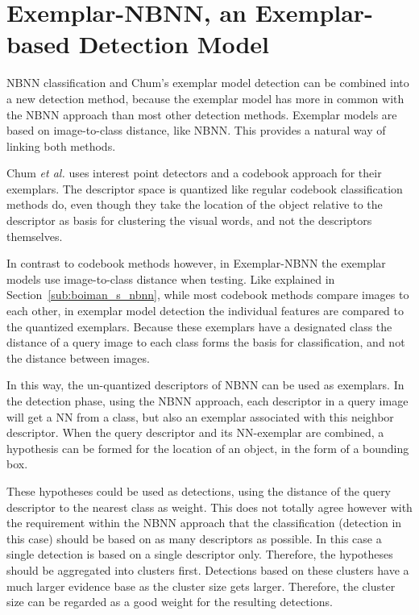 
\section{Exemplar-NBNN, an Exemplar-based Detection Model} %
\label{cha:linking}

NBNN classification and Chum's exemplar model detection \cite{chum2007exemplar} can be combined into a new detection method, because the exemplar model has more in common with the NBNN approach than most other detection methods. Exemplar models are based on image-to-class distance, like NBNN. This provides a natural way of linking both methods.

Chum \emph{et al.}\cite{chum2007exemplar} uses interest point detectors and a codebook approach for their exemplars. The descriptor space is quantized like regular codebook classification methods do, even though they take the location of the object relative to the descriptor as basis for clustering the visual words, and not the descriptors themselves.

In contrast to codebook methods however, in Exemplar-NBNN the exemplar models use image-to-class distance when testing. Like explained in Section~\ref{sub:boiman_s_nbnn}, while most codebook methods compare images to each other, in exemplar model detection the individual features are compared to the quantized exemplars. Because these exemplars have a designated class the distance of a query image to each class forms the basis for classification, and not the distance between images.

In this way, the un-quantized descriptors of NBNN can be used as exemplars. In the detection phase, using the NBNN approach, each descriptor in a query image will get a NN from a class, but also an exemplar associated with this neighbor descriptor. When the query descriptor and its NN-exemplar are combined, a hypothesis can be formed for the location of an object, in the form of a bounding box.

These hypotheses could be used as detections, using the distance of the query descriptor to the nearest class as weight. This does not totally agree however with the requirement within the NBNN approach that the classification (detection in this case) should be based on as many descriptors as possible. In this case a single detection is based on a single descriptor only. Therefore, the hypotheses should be aggregated into clusters first. Detections based on these clusters have a much larger evidence base as the cluster size gets larger. Therefore, the cluster size can be regarded as a good weight for the resulting detections.


